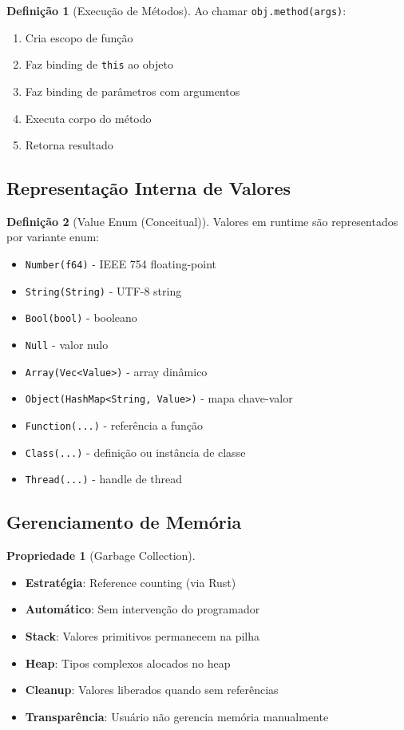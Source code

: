 \documentclass[12pt,a4paper]{article}
\theoremstyle{definition}
\newtheorem{definition}{Definição}[section]
\newtheorem{property}{Propriedade}[section]
\begin{document}
\begin{definition}[Execução de Métodos]
Ao chamar \texttt{obj.method(args)}:

\begin{enumerate}
    \item Cria escopo de função
    \item Faz binding de \texttt{this} ao objeto
    \item Faz binding de parâmetros com argumentos
    \item Executa corpo do método
    \item Retorna resultado
\end{enumerate}
\end{definition}

\subsection{Representação Interna de Valores}

\begin{definition}[Value Enum (Conceitual)]
Valores em runtime são representados por variante enum:

\begin{itemize}
    \item \texttt{Number(f64)} - IEEE 754 floating-point
    \item \texttt{String(String)} - UTF-8 string
    \item \texttt{Bool(bool)} - booleano
    \item \texttt{Null} - valor nulo
    \item \texttt{Array(Vec<Value>)} - array dinâmico
    \item \texttt{Object(HashMap<String, Value>)} - mapa chave-valor
    \item \texttt{Function(...)} - referência a função
    \item \texttt{Class(...)} - definição ou instância de classe
    \item \texttt{Thread(...)} - handle de thread
\end{itemize}
\end{definition}

\subsection{Gerenciamento de Memória}

\begin{property}[Garbage Collection]
\begin{itemize}
    \item \textbf{Estratégia}: Reference counting (via Rust)
    \item \textbf{Automático}: Sem intervenção do programador
    \item \textbf{Stack}: Valores primitivos permanecem na pilha
    \item \textbf{Heap}: Tipos complexos alocados no heap
    \item \textbf{Cleanup}: Valores liberados quando sem referências
    \item \textbf{Transparência}: Usuário não gerencia memória manualmente
\end{itemize}
\end{property}
\end{document}
